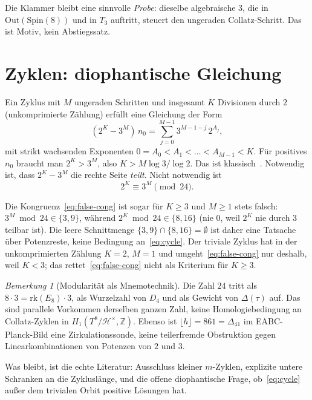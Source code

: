 \documentclass[11pt,a4paper]{article}
\theoremstyle{definition}
\theoremstyle{remark}
\newtheorem{remark}[theorem]{Bemerkung}
\numberwithin{equation}{section}
\begin{document}
Die Klammer bleibt eine sinnvolle \emph{Probe}: dieselbe algebraische \(3\), die in
\(\mathrm{Out}(\mathrm{Spin}(8))\) und in \(T_3\) auftritt, steuert den ungeraden Collatz-Schritt.
Das ist Motiv, kein Abstiegssatz.

\section{Zyklen: diophantische Gleichung}

Ein Zyklus mit \(M\) ungeraden Schritten und insgesamt \(K\) Divisionen durch \(2\)
(unkomprimierte Z\"ahlung) erf\"ullt eine Gleichung der Form
\begin{equation}
\label{eq:cycle}
(2^K-3^M)\,n_0
=\sum_{j=0}^{M-1} 3^{M-1-j}\,2^{A_j},
\end{equation}
mit strikt wachsenden Exponenten \(0=A_0<A_1<\dots<A_{M-1}<K\).
F\"ur positives \(n_0\) braucht man \(2^K>3^M\), also \(K>M\log 3/\log 2\).
Das ist klassisch~\cite{Lagarias1985}.
Notwendig ist, dass \(2^K-3^M\) die rechte Seite \emph{teilt}.
Nicht notwendig ist
\begin{equation}
\label{eq:false-cong}
2^K\equiv 3^M\pmod{24}.
\end{equation}

Die Kongruenz~\eqref{eq:false-cong} ist sogar f\"ur \(K\ge 3\) und \(M\ge 1\)
stets falsch: \(3^M\bmod 24\in\{3,9\}\), w\"ahrend \(2^K\bmod 24\in\{8,16\}\)
(nie \(0\), weil \(2^K\) nie durch \(3\) teilbar ist).
Die leere Schnittmenge \(\{3,9\}\cap\{8,16\}=\emptyset\) ist daher eine Tatsache
\"uber Potenzreste, keine Bedingung an~\eqref{eq:cycle}.
Der triviale Zyklus hat in der unkomprimierten Z\"ahlung \(K=2\), \(M=1\)
und umgeht~\eqref{eq:false-cong} nur deshalb, weil \(K<3\);
das rettet~\eqref{eq:false-cong} nicht als Kriterium f\"ur \(K\ge 3\).

\begin{remark}[Modularit\"at als Mnemotechnik]
Die Zahl \(24\) tritt als \(8\cdot 3=\mathrm{rk}(E_8)\cdot 3\),
als Wurzelzahl von \(D_4\) und als Gewicht von \(\Delta(\tau)\) auf.
Das sind parallele Vorkommen derselben ganzen Zahl, keine Homologiebedingung
an Collatz-Zyklen in \(H_1(T^8/\mathcal{H}^\times,\mathbb{Z})\).
Ebenso ist \(\lfloor h\rfloor=861=\Delta_{41}\) im EABC-Planck-Bild eine
Zirkulationssonde, keine teilerfremde Obstruktion gegen Linearkombinationen
von Potenzen von \(2\) und \(3\).
\end{remark}

Was bleibt, ist die echte Literatur: Ausschluss kleiner \(m\)-Zyklen,
explizite untere Schranken an die Zyklusl\"ange, und die offene diophantische
Frage, ob~\eqref{eq:cycle} außer dem trivialen Orbit positive L\"osungen hat.
\end{document}
